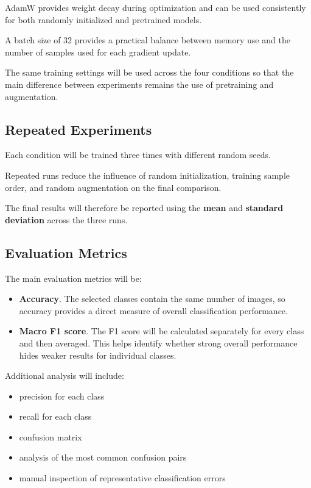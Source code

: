 \documentclass[11pt,a4paper]{article}
\begin{document}
AdamW provides weight decay during optimization and can be used consistently for both
randomly initialized and pretrained models.

A batch size of 32 provides a practical balance between memory use and the number of
samples used for each gradient update.

The same training settings will be used across the four conditions so that the main
difference between experiments remains the use of pretraining and augmentation.

\subsection{Repeated Experiments}

Each condition will be trained three times with different random seeds.

Repeated runs reduce the influence of random initialization, training sample order,
and random augmentation on the final comparison.

The final results will therefore be reported using the \textbf{mean} and
\textbf{standard deviation} across the three runs.

\subsection{Evaluation Metrics}

The main evaluation metrics will be:

\begin{itemize}
    \item \textbf{Accuracy}. The selected classes contain the same number of images,
    so accuracy provides a direct measure of overall classification performance.

    \item \textbf{Macro F1 score}. The F1 score will be calculated separately for
    every class and then averaged. This helps identify whether strong overall
    performance hides weaker results for individual classes.
\end{itemize}

Additional analysis will include:

\begin{itemize}
    \item precision for each class
    \item recall for each class
    \item confusion matrix
    \item analysis of the most common confusion pairs
    \item manual inspection of representative classification errors
\end{itemize}
\end{document}
